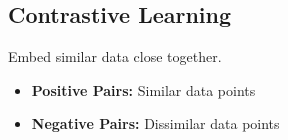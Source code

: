 \subsection{Contrastive Learning}
\begin{notes}
    Embed similar data close together. 
    \begin{itemize}
        \item \textbf{Positive Pairs:} Similar data points
        \item \textbf{Negative Pairs:} Dissimilar data points
    \end{itemize}
\end{notes}